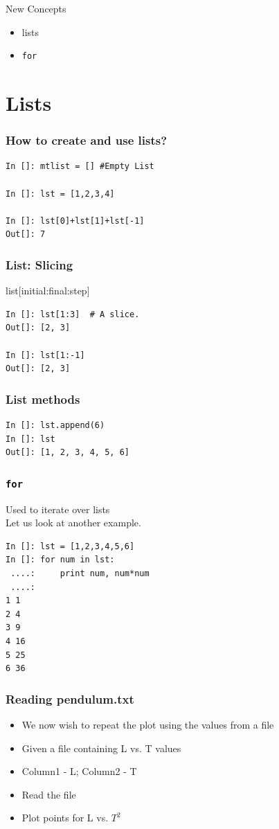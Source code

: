 \documentclass[14pt,compress]{beamer}
\newcounter{time}
\newcommand{\inctime}[1]{\addtocounter{time}{#1}{\tiny \thetime\ m}}
\newcommand{\typ}[1]{\lstinline{#1}}
\begin{document}
\begin{frame}{New Concepts}
  \begin{itemize}
    \item lists
    \item \typ{for}
  \end{itemize}
\end{frame}

\section{Lists}
\begin{frame}[fragile]
  \frametitle{How to create and use lists?}
\begin{lstlisting}
In []: mtlist = [] #Empty List

In []: lst = [1,2,3,4] 

In []: lst[0]+lst[1]+lst[-1]
Out[]: 7
\end{lstlisting}
\end{frame}

\begin{frame}[fragile]
  \frametitle{List: Slicing}
list[initial:final:step]
\begin{lstlisting}
In []: lst[1:3]  # A slice.
Out[]: [2, 3]

In []: lst[1:-1]
Out[]: [2, 3]
\end{lstlisting}
\end{frame}

\begin{frame}[fragile]
  \frametitle{List methods}
\begin{lstlisting}
In []: lst.append(6)
In []: lst
Out[]: [1, 2, 3, 4, 5, 6]
\end{lstlisting}
\end{frame}

\begin{frame}[fragile]
\frametitle{\texttt{for}}
Used to iterate over lists\\ Let us look at another example.
\begin{lstlisting}
In []: lst = [1,2,3,4,5,6]
In []: for num in lst:
 ....:     print num, num*num
 ....:    
1 1
2 4
3 9
4 16
5 25
6 36
\end{lstlisting}
\end{frame}

\begin{frame}[fragile]
\frametitle{Reading pendulum.txt}
\begin{itemize}
  \item We now wish to repeat the plot using the values from a file
  \item Given a file containing L vs. T values 
  \item Column1 - L; Column2 - T  
  \item Read the file
  \item Plot points for L vs. $T^2$ 
\end{itemize}
\end{frame}
\end{document}
